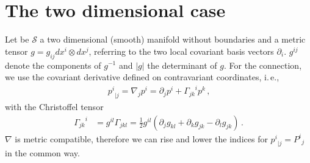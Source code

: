 \documentclass{scrartcl}
\newcommand{\ie}{i.\,e.}%
\newcommand{\formComma}{\,\text{,}}
\newcommand{\formPeriod}{\,\text{.}}
\newcommand{\surf}{\mathcal{S}}
\newcommand{\sftensor}[3]{{{#1}^{#2}}_{#3}}
\newcommand{\fstensor}[3]{{{#1}_{#2}}^{#3}}
\newcommand{\christoffel}[3]{\fstensor{\Gamma}{#1#2}{#3}}
\newcommand{\ffbasis}[2]{dx^{#1} \otimes dx^{#2}}
\begin{document}
    \section{The two dimensional case}
      Let be \( \surf \) a two dimensional (smooth) manifold without boundaries and a metric tensor
      \( g=g_{ij}\ffbasis{i}{j} \), referring to the two local covariant basis vectors \( \partial_{i} \).
      \( g^{ij} \) denote the components of \( g^{-1} \) and \( |g| \) the determinant of \( g \).
      For the connection, we use the covariant derivative defined on contravariant coordinates, \ie,
      \begin{align}
        \sftensor{p}{i}{|j} = \nabla_{j}p^{i} = \partial_{j}p^{i} + \christoffel{j}{k}{i}p^{k} \formComma
      \end{align}
      with the Christoffel tensor
      \begin{align}
        \christoffel{j}{k}{i} &= g^{il}\Gamma_{jkl} = \frac{1}{2}g^{il}
              \left( \partial_{j}g_{kl} + \partial_{k}g_{jk} - \partial_{l}g_{jk} \right)\formPeriod
      \end{align}
      \( \nabla \) is metric compatible, therefore we can rise and lower the indices for 
      \( \sftensor{p}{i}{|j} =  \sftensor{P}{i}{j}\) in the common way.
\end{document}
